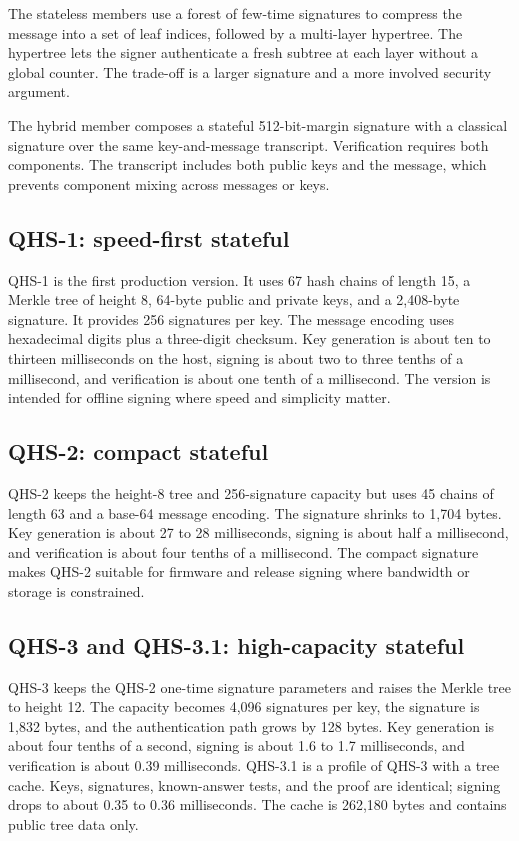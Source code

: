 \documentclass[11pt,a4paper]{article}
\begin{document}
The stateless members use a forest of few-time signatures to compress the
message into a set of leaf indices, followed by a multi-layer hypertree. The
hypertree lets the signer authenticate a fresh subtree at each layer without a
global counter. The trade-off is a larger signature and a more involved
security argument.

The hybrid member composes a stateful 512-bit-margin signature with a classical
signature over the same key-and-message transcript. Verification requires both
components. The transcript includes both public keys and the message, which
prevents component mixing across messages or keys.

\subsection{QHS-1: speed-first stateful}

QHS-1 is the first production version. It uses 67 hash chains of length 15,
a Merkle tree of height 8, 64-byte public and private keys, and a 2,408-byte
signature. It provides 256 signatures per key. The message encoding uses
hexadecimal digits plus a three-digit checksum. Key generation is about ten to
thirteen milliseconds on the host, signing is about two to three tenths of a
millisecond, and verification is about one tenth of a millisecond. The version
is intended for offline signing where speed and simplicity matter.

\subsection{QHS-2: compact stateful}

QHS-2 keeps the height-8 tree and 256-signature capacity but uses 45 chains of
length 63 and a base-64 message encoding. The signature shrinks to 1,704 bytes.
Key generation is about 27 to 28 milliseconds, signing is about half a
millisecond, and verification is about four tenths of a millisecond. The
compact signature makes QHS-2 suitable for firmware and release signing where
bandwidth or storage is constrained.

\subsection{QHS-3 and QHS-3.1: high-capacity stateful}

QHS-3 keeps the QHS-2 one-time signature parameters and raises the Merkle tree
to height 12. The capacity becomes 4,096 signatures per key, the signature is
1,832 bytes, and the authentication path grows by 128 bytes. Key generation is
about four tenths of a second, signing is about 1.6 to 1.7 milliseconds, and
verification is about 0.39 milliseconds. QHS-3.1 is a profile of QHS-3 with a
tree cache. Keys, signatures, known-answer tests, and the proof are identical;
signing drops to about 0.35 to 0.36 milliseconds. The cache is 262,180 bytes
and contains public tree data only.
\end{document}
